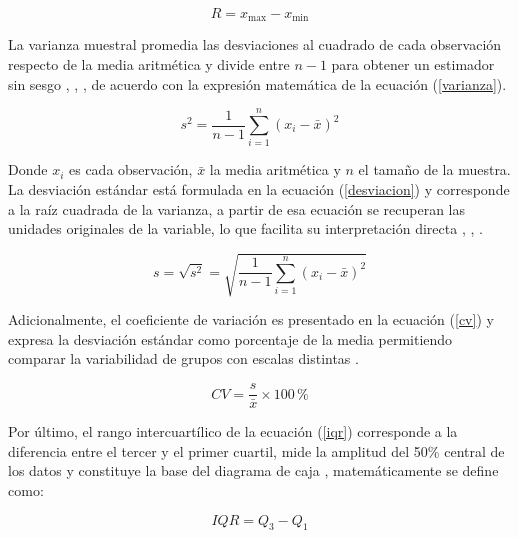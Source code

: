         \begin{equation}
            R = x_{\max} - x_{\min}
            \label{rango}
        \end{equation}

        La varianza muestral promedia las desviaciones al cuadrado de cada observación
        respecto de la media aritmética y divide entre $n - 1$ para obtener un estimador
        sin sesgo \cite{triola2018estadistica}, \cite{walpole2012probabilidad},
        \cite{castro2026visualizacion}, de acuerdo con la expresión matemática de la
        ecuación (\ref{varianza}).

        \begin{equation}
            s^{2} = \frac{1}{n - 1} \sum_{i=1}^{n} \left( x_{i} - \bar{x} \right)^{2}
            \label{varianza}
        \end{equation}

        Donde $x_{i}$ es cada observación, $\bar{x}$ la media aritmética y $n$ el tamaño
        de la muestra. La desviación estándar está formulada en la ecuación
        (\ref{desviacion}) y corresponde a la raíz cuadrada de la varianza, a partir de
        esa ecuación se recuperan las unidades originales de la variable, lo que
        facilita su interpretación directa \cite{triola2018estadistica},
        \cite{walpole2012probabilidad}, \cite{castro2026visualizacion}.

        \begin{equation}
            s = \sqrt{s^{2}} =
            \sqrt{\frac{1}{n - 1} \sum_{i=1}^{n} \left( x_{i} - \bar{x} \right)^{2}}
            \label{desviacion}
        \end{equation}

        Adicionalmente, el coeficiente de variación es presentado en la ecuación
        (\ref{cv}) y expresa la desviación estándar como porcentaje de la media 
        permitiendo comparar la variabilidad de grupos con escalas distintas
        \cite{walpole2012probabilidad}.

        \begin{equation}
            CV = \frac{s}{\bar{x}} \times 100\,\text{\%}
            \label{cv}
        \end{equation}

        Por último, el rango intercuartílico de la ecuación (\ref{iqr}) corresponde a 
        la diferencia entre el tercer y el primer cuartil, mide la amplitud del 50\%
        central de los datos y constituye la base del diagrama de caja
        \cite{walpole2012probabilidad}, matemáticamente se define como:

        \begin{equation}
            IQR = Q_{3} - Q_{1}
            \label{iqr}
        \end{equation}
